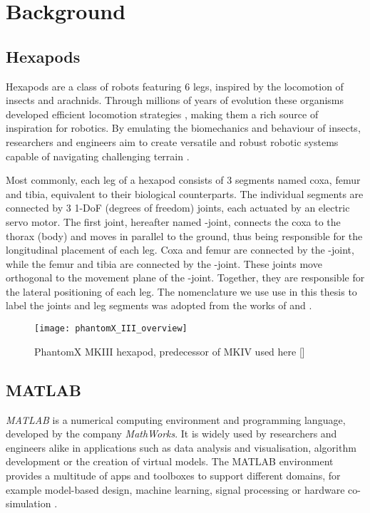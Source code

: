 \chapter{Background}
\label{ch:background}

\section{Hexapods} \label{sec: Hexapods}
Hexapods are a class of robots featuring 6 legs, inspired by the locomotion of insects and arachnids.
Through millions of years of evolution these organisms developed efficient locomotion strategies \parencite{neville2006bipedal}, making them a rich source of inspiration for robotics.
By emulating the biomechanics and behaviour of insects, researchers and engineers aim to create versatile and robust robotic systems capable of navigating challenging terrain \parencite{irawan2011optimal, ouyang2021adaptive, schilling2013walknet}.

Most commonly, each leg of a hexapod consists of 3 segments named coxa, femur and tibia, equivalent to their biological counterparts.
The individual segments are connected by 3 1-DoF (degrees of freedom) joints, each actuated by an electric servo motor.
The first joint, hereafter named \textalpha-joint, connects the coxa to the thorax (body) and moves in parallel to the ground, thus being responsible for the longitudinal placement of each leg.
Coxa and femur are connected by the \textbeta-joint, while the femur and tibia are connected by the \textgamma-joint. 
These joints move orthogonal to the movement plane of the \textalpha-joint. Together, they are responsible for the lateral positioning of each leg.
The nomenclature we use use in this thesis to label the joints and leg segments was adopted from the works of \cite{schilling2013walknet} and \cite{HeterarchicalArchitectureSchilling}.
\begin{figure}[h]
	\centerline{\texttt{[image: phantomX\_III\_overview]}}
	\caption{PhantomX MKIII hexapod, predecessor of MKIV used here [\cite{PhantomX_MKIII}]}
	\label{figure: PhantomX MKIII}
\end{figure}




\section{MATLAB}
\textit{MATLAB\textsuperscript{\textregistered}} is a numerical computing environment and programming language, developed by the company \textit{MathWorks\textsuperscript{\textregistered}}.
It is widely used by researchers and engineers alike in applications such as data analysis and visualisation, algorithm development or the creation of virtual models.
The MATLAB environment provides a multitude of apps and toolboxes to support different domains, for example model-based design, machine learning, signal processing or hardware co-simulation \parencite{MATLAB}.

